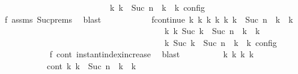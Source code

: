 \begin{isabellebody}
\ \ \ \ \ \ \ \ \ \ \ \ \ \ \ \ \ \ \ \ \ \ {\isasymand}\ {\isasymrho}\ {\isasymin}\ {\isasymlbrakk}\ {\isasymGamma}\isactrlsub k{\isacharcomma}\ {\isasymdelta}k\ {\isacharplus}\ Suc\ n\ {\isasymturnstile}\ {\isasymPsi}\isactrlsub k\ {\isasymtriangleright}\ {\isasymPhi}\isactrlsub k\ {\isasymrbrakk}\isactrlsub c\isactrlsub o\isactrlsub n\isactrlsub f\isactrlsub i\isactrlsub g{\isacartoucheclose}\isanewline
\ \ \ \ \ \ \ \ \ \ \isamarkupfalse%
\ f{}\ assms{\isacharparenleft}{}{\isacharparenright}\ Suc{\isachardot}prems\ \isamarkupfalse%
\ blast\isanewline
\ \ \ \ \ \ \ \ \isamarkupfalse%
\ \isamarkupfalse%
\ fcontinue{\isacharcolon}\ {\isacartoucheopen}{\isasymexists}{\isasymGamma}\isactrlsub k{\isacharprime}\ {\isasymPsi}\isactrlsub k{\isacharprime}\ {\isasymPhi}\isactrlsub k{\isacharprime}\ k{\isacharprime}{\isachardot}\ {\isacharparenleft}{\isacharparenleft}{\isasymGamma}\isactrlsub k{\isacharcomma}\ {\isasymdelta}k\ {\isacharplus}\ Suc\ n\ {\isasymturnstile}\ {\isasymPsi}\isactrlsub k\ {\isasymtriangleright}\ {\isasymPhi}\isactrlsub k{\isacharparenright}\isanewline
\ \ \ \ \ \ \ \ \ \ \ \ \ \ \ \ \ \ \ \ \ \ \ \ \ \ \ \ \ \ \ \ \ \ \ \ \ \ \ {\isasymhookrightarrow}\isactrlbsup k{\isacharprime}\isactrlesup \ {\isacharparenleft}{\isasymGamma}\isactrlsub k{\isacharprime}{\isacharcomma}\ Suc\ {\isacharparenleft}{\isasymdelta}k\ {\isacharplus}\ Suc\ n{\isacharparenright}\ {\isasymturnstile}\ {\isasymPsi}\isactrlsub k{\isacharprime}\ {\isasymtriangleright}\ {\isasymPhi}\isactrlsub k{\isacharprime}{\isacharparenright}{\isacharparenright}\isanewline
\ \ \ \ \ \ \ \ \ \ \ \ \ \ \ \ \ \ \ \ \ \ \ \ \ \ \ \ \ \ \ \ \ \ \ {\isasymand}\ {\isasymrho}\ {\isasymin}\ {\isasymlbrakk}\ {\isasymGamma}\isactrlsub k{\isacharprime}{\isacharcomma}\ Suc\ {\isacharparenleft}{\isasymdelta}k\ {\isacharplus}\ Suc\ n{\isacharparenright}\ {\isasymturnstile}\ {\isasymPsi}\isactrlsub k{\isacharprime}\ {\isasymtriangleright}\ {\isasymPhi}\isactrlsub k{\isacharprime}\ {\isasymrbrakk}\isactrlsub c\isactrlsub o\isactrlsub n\isactrlsub f\isactrlsub i\isactrlsub g{\isacartoucheclose}\isanewline
\ \ \ \ \ \ \ \ \ \ \isamarkupfalse%
\ f{}\ cont\ instant{\isacharunderscore}index{\isacharunderscore}increase\ \isamarkupfalse%
\ blast\isanewline
\ \ \ \ \ \ \ \ \isamarkupfalse%
\ {\isasymGamma}\isactrlsub k{\isacharprime}\ {\isasymPsi}\isactrlsub k{\isacharprime}\ {\isasymPhi}\isactrlsub k{\isacharprime}\ k{\isacharprime}\isanewline
\ \ \ \ \ \ \ \ \ \ \ cont{}{\isacharcolon}\ {\isacartoucheopen}{\isacharparenleft}{\isacharparenleft}{\isasymGamma}\isactrlsub k{\isacharcomma}\ {\isasymdelta}k\ {\isacharplus}\ Suc\ n\ {\isasymturnstile}\ {\isasymPsi}\isactrlsub k\ {\isasymtriangleright}\ {\isasymPhi}\isactrlsub k{\isacharparenright}\isanewline

\end{isabellebody}
